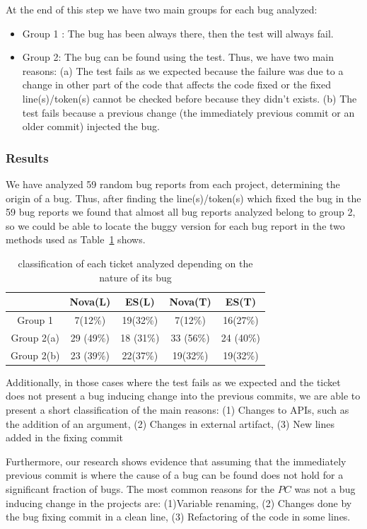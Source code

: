 \documentclass[a4paper]{article}
\begin{document}
At the end of this step we have two main groups for each bug analyzed:
\begin{itemize}
	\item Group 1 : The bug has been always there, then the test will always fail.
	\item Group 2: The bug can be found using the test. Thus, we have two main reasons: (a) The test fails as we expected because the failure was due to a change in other part of the code that affects the code fixed or  the fixed line(s)/token(s) cannot be checked before because they didn't exists. (b) The test fails because a previous change (the immediately previous commit or an older commit) injected the bug.
\end{itemize}
\subsubsection{Results}

We have analyzed 59 random bug reports from each project, determining the origin of a bug. Thus, after finding the line(s)/token(s) which fixed the bug in the 59 bug reports we found that almost all bug reports analyzed belong to group 2, so we could be able to locate the buggy version for each bug report in the two methods used as Table~\ref{fig:tableI} shows.

\begin{table}[!t]
\renewcommand{\arraystretch}{1.3}
\caption{classification of each ticket analyzed depending on the nature of its bug}
\label{fig:tableI}
\centering
\begin{tabular}{|c||c||c|c|c|}
\hline
 & Nova(L) & ES(L)& Nova(T) & ES(T) \\
\hline
Group 1 & 7(12\%) & 19(32\%)& 7(12\%) & 16(27\%)\\
\hline
Group 2(a) & 29 (49\%) & 18 (31\%)& 33 (56\%) & 24 (40\%)\\
\hline
Group 2(b) & 23 (39\%) & 22(37\%)& 19(32\%) & 19(32\%)\\
\hline
\end{tabular}
\end{table}

Additionally, in those cases where the test fails as we expected and the ticket does not present a bug inducing change into the previous commits, we are able to present a short classification of the main reasons: (1) Changes to APIs, such as the addition of an argument, (2) Changes in external artifact, (3) New lines added in the fixing commit

Furthermore, our research shows evidence that assuming that the immediately previous commit is where the cause of a bug can be found does not hold for a significant fraction of bugs. The most common reasons for the $PC$ was not a bug inducing change in the projects are: (1)Variable renaming, (2) Changes done by the bug fixing commit in a clean line, (3) Refactoring of the code in some lines.
\end{document}
